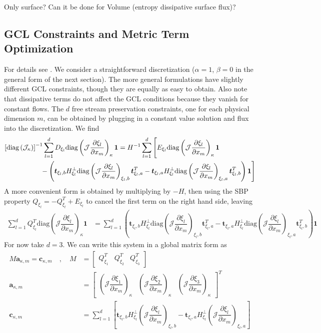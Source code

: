 \documentclass[12pt,a4paper]{article}
\newcommand{\pder}[2][]{\dfrac{\partial #1}{\partial #2}} %
\newcommand{\fn}[1]{\mathcal{#1}} %
\begin{document}
Only surface? Can it be done for Volume (entropy dissipative surface flux)?

\subsection{GCL Constraints and Metric Term Optimization}

For details see \cite{del_rey_fernandez_extension_2019}. We consider a straightforward discretization ($\alpha=1$, $\beta=0$ in the general form of the next section). The more general formulations have slightly different GCL constraints, though they are equally as easy to obtain. Also note that dissipative terms do not affect the GCL conditions because they vanish for constant flows. The $d$ free stream preservation constraints, one for each physical dimension $m$, can be obtained by plugging in a constant value solution and flux into the discretization. We find
\begin{align*}
 \left[ \text{diag}\left( \fn{J}_\kappa \right) \right]^{-1} \sum_{l=1}^d  D_{\xi_l} \text{diag} \left( \fn{J} \pder[\xi_l]{x_m} \right)_\kappa \bm{1} &= H^{-1} \sum_{l=1}^d \Bigg[ E_{\xi_l} \text{diag}  \left( \fn{J} \pder[\xi_l]{x_m} \right)_{\kappa} \bm{1} \\
& \hspace{-4cm} - \left( \bm{t}_{\xi_l, b} H^{\bot}_{\xi_l}  \text{diag} \left( \fn{J} \pder[\xi_l]{x_m} \right)_{\xi_l,b} \bm{t}_{\xi_l, a}^T - \bm{t}_{\xi_l, a} H^{\bot}_{\xi_l} \text{diag} \left( \fn{J} \pder[\xi_l]{x_m} \right)_{\xi_l,a} \bm{t}_{\xi_l, b}^T  \right) \bm{1} \Bigg]
\end{align*}
A more convenient form is obtained by multiplying by $-H$, then using the SBP property $Q_{\xi_l} = -Q_{\xi_l}^T + E_{\xi_l}$ to cancel the first term on the right hand side, leaving
\begin{align*}
 \sum_{l=1}^d Q_{\xi_l}^T \text{diag} \left( \fn{J} \pder[\xi_l]{x_m} \right)_\kappa \bm{1} &= \sum_{l = 1}^d  \left( \bm{t}_{\xi_l,b} H^{\bot}_{\xi_l} \text{diag} \left( \fn{J} \pder[\xi_l]{x_m} \right)_{\xi_l,b} \bm{t}^T_{\xi_l,a} - \bm{t}_{\xi_l,a} H^{\bot}_{\xi_l} \text{diag} \left( \fn{J} \pder[\xi_l]{x_m} \right)_{\xi_l,a} \bm{t}_{\xi_l,b}^T  \right) \bm{1} 
\end{align*}
For now take $d=3$. We can write this system in a global matrix form as
\begin{align*}
M \bm{a}_{\kappa , m} = \bm{c}_{\kappa , m} \quad , \quad M &= \begin{bmatrix}
Q_{\xi_1}^T & Q_{\xi_2}^T & Q_{\xi_3}^T
\end{bmatrix} \\
\bm{a}_{\kappa , m} &= \begin{bmatrix}
 \left( \fn{J} \pder[\xi_1]{x_m} \right)_\kappa &  \left( \fn{J} \pder[\xi_2]{x_m} \right)_\kappa & \left( \fn{J} \pder[\xi_3]{x_m} \right)_\kappa \end{bmatrix}^T \\
 \bm{c}_{\kappa , m} &= \sum_{l = 1}^d \left[ \bm{t}_{\xi_l,b} H^{\bot}_{\xi_l}  \left( \fn{J} \pder[\xi_l]{x_m} \right)_{\xi_l,b} - \bm{t}_{\xi_l,a} H^{\bot}_{\xi_l}  \left( \fn{J} \pder[\xi_l]{x_m} \right)_{\xi_l,a} \right]
\end{align*}
\end{document}
